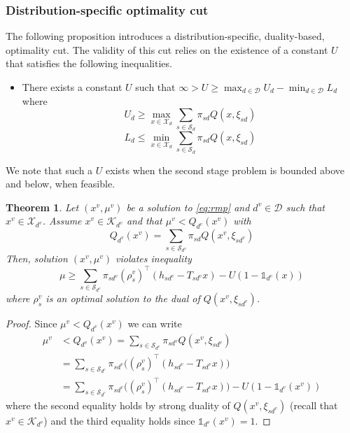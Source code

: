 \documentclass[12pt]{article}
\newtheorem{theorem}{Theorem}%
\theoremstyle{thmstylethree}%
\newcommand{\mtc}[1] {\mathcal{#1}}
\def\Ind{\ensuremath{\mathbb{1}}}
\begin{document}
\subsubsection{Distribution-specific optimality cut}
\label{subsubsec:cont_sp:opt_cut}
The following proposition introduces a distribution-specific, duality-based, optimality cut. The validity of this cut relies on the existence of a constant $U$ that satisfies the following inequalities. 

\begin{itemize}
    \item[\textbf{A3}] There exists a constant $U$ such that  $\infty>U\geq \max_{d\in\mtc{D}}U_d-\min_{d\in\mtc{D}}L_d$ where
    $$U_d\geq \max_{x\in\mtc{X}_{d}}\sum_{s\in\mtc{S}_{d}}\pi_{sd}Q(x,\xi_{sd})$$
    $$L_d\leq \min_{x\in\mtc{X}_{d}}\sum_{s\in\mtc{S}_{d}}\pi_{sd}Q(x,\xi_{sd})$$

\end{itemize}

We note that such a $U$ exists when the second stage problem is bounded above and below, when feasible.

\begin{theorem}\label{prop:oc:continuous}
Let $(x^v,\mu^v)$ be a solution to \eqref{eq:rmp} and
$d^v\in\mtc{D}$ such that $x^v\in\mtc{X}_{d^v}$. Assume $x^v\in\mtc{K}_{d^v}$ and that $\mu^v < Q_{d^v}(x^v)$ with  
$$Q_{d^v}(x^v)=\sum_{s\in\mtc{S}_{d^v}}\pi_{sd}Q(x^v,\xi_{sd^v})$$ 
Then, solution $(x^v,\mu^v)$ violates inequality
\begin{equation}\label{eq:continuous:oc}
    \mu\geq \sum_{s\in\mtc{S}_{d^v}}\pi_{sd^v}(\rho^v_s)^\top (h_{sd^v}-T_{sd^v}x) - U(1-\Ind_{d^v}(x))
\end{equation}
where $\rho^v_s$ is an optimal solution to the dual of $Q(x^v,\xi_{sd^v})$.
\end{theorem}
\begin{proof}
Since $\mu^v < Q_{d^v}(x^v)$ we can write
\begin{align*}
    \mu^v &< Q_{d^v}(x^v)=\sum_{s\in\mtc{S}_{d^v}}\pi_{sd^v}Q(x^v,\xi_{sd^v})\\
    &=\sum_{s\in\mtc{S}_{d^v}}\pi_{sd^v}\bigg((\rho^v_s)^\top(h_{sd^v}-T_{sd^v}x) \bigg)\\
    &=\sum_{s\in\mtc{S}_{d^v}}\pi_{sd^v}\bigg((\rho^v_s)^\top(h_{sd^v}-T_{sd^v}x)\bigg)- U(1-\Ind_{d^v}(x^v))
\end{align*}
where the second equality holds by strong duality of $Q(x^v,\xi_{sd^v})$ (recall that $x^v\in\mtc{K}_{d^v}$) and the third equality holds since $\Ind_{d^v}(x^v)=1$.
\end{proof}
\end{document}
